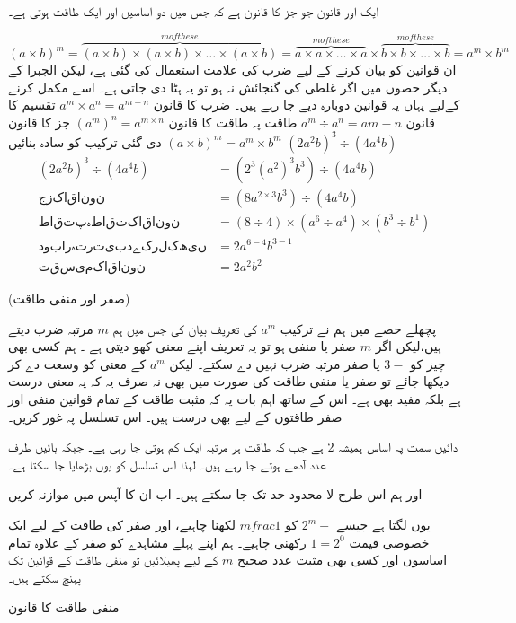 ایک اور قانون جو جز کا قانون ہے کہ جس میں دو اساسیں اور ایک طاقت ہوتی ہے۔ 

\[(a\times b)^{m}=\overbrace{(a\times b)\times(a\times b)\times\dotsc\times (a\times b)}^{m of these}=\overbrace{a\times a\times\dotsc\times a}^{m of these}\times \overbrace{b\times b\times\dotsc\times b}^{m of these}=a^{m}\times b^{m}\]
ان قوانین کو بیان کرنے کے لیے ضرب کی علامت استعمال کی گئی ہے، لیکن الجبرا کے دیگر حصوں میں اگر غلطی کی گنجائش نہ ہو تو یہ ہٹا دی جاتی ہے۔ اسے مکمل کرنے کےلیے یہاں یہ قوانین دوبارہ دیے جا رہے ہیں۔
ضرب کا قانون
\(a^{m}\times a^{n}=a^{m+n}\)
تقسیم کا قانون
\(a^{m}\div a^{n}=a{m-n}\)
طاقت پہ طاقت کا قانون
\((a^{m})^{n}=a^{m\times n}\)
جز کا قانون
\((a\times b)^{m}=a^{m}\times b^{m}\)
دی گئی ترکیب کو سادہ بنائیں
\((2a^{2}b)^{3}\div (4a^{4}b)\)
\begin{align*}
(2a^{2}b)^{3}\div (4a^{4}b)&=(2^{3}(a^{2})^{3}b^{3})\div
 (4a^{4}b)\\
جز کا قانون
&=(8a^{2\times 3}b^{3})\div (4a^{4}b)\\
طاقت پہ طاقت کا قانون
&=(8\div 4)\times (a^{6}\div a^{4})\times (b^{3}\div b^{1})\\
دوبارہ ترتیب دے کر لکھیں
&=2a^{6-4}b^{3-1}\\
تقسیم کا قانون
&=2a^{2}b^{2}
\end{align*}


(صفر اور منفی طاقت)

پچھلے حصے میں ہم نے ترکیب \({a}^m\) کی تعریف بیان کی جس میں ہم  \(m\) مرتبہ ضرب دیتے ہیں،لیکن اگر  \(m\) صفر یا منفی ہو تو یہ تعریف اپنے معنی کھو دیتی ہے ۔ ہم کسی بھی چیز کو \(3-\) یا صفر مرتبہ ضرب نہیں دے سکتے۔ لیکن \({a}^m\) کے معنی کو وسعت دے کر دیکھا جائے تو صفر یا منفی طاقت کی صورت میں بھی نہ صرف یہ کہ یہ معنی درست ہے بلکہ مفید بھی ہے۔ اس کے ساتھ اہم بات یہ کہ مثبت طاقت کے تمام قوانین منفی اور صفر طاقتوں کے لیے بھی درست ہیں۔
اس تسلسل پہ غور کریں۔

دائیں سمت پہ اساس ہمیشہ \(2\)  ہے جب کہ طاقت ہر مرتبہ ایک کم ہوتی جا رہی ہے۔ جبکہ بائیں طرف عدد آدھے ہوتے جا رہے ہیں۔ لہذا اس تسلسل کو یوں بڑھایا جا سکتا ہے۔

 اور ہم اس طرح لا محدود حد تک جا سکتے ہیں۔  اب ان کا آپس میں موازنہ کریں

یوں لگتا ہے جیسے \({2}^m-\) کو \({{m}frac{1}}\) لکھنا چاہیے، اور صفر کی طاقت کے لیے ایک خصوصی قیمت \(1={2}^0\) رکھنی چاہیے۔
ہم اپنے پہلے مشاہدے کو  صفر کے علاوہ تمام اساسوں اور کسی بھی مثبت عدد صحیح \(m\) کے لیے پھیلائیں تو منفی طاقت کے قوانین تک پہنچ سکتے ہیں۔

منفی طاقت کا قانون


